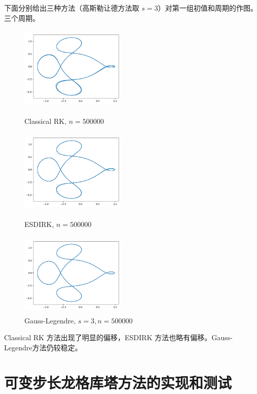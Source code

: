 \documentclass{ctexart}
\begin{document}
下面分别给出三种方法（高斯勒让德方法取 $s=3$）对第一组初值和周期的作图。三个周期。

\begin{figure}[htbp]
	\begin{minipage}{5cm}
		\centering
		\includegraphics[width = 5cm, height = 4cm]{21.png}
		\caption{Classical RK, $n=500000$}
		\label{21}
	\end{minipage}
	\begin{minipage}{5cm}
		\centering
		\includegraphics[width = 5cm, height = 4cm]{22.png}
		\caption{ESDIRK, $n=500000$}
		\label{22}
	\end{minipage}
	\begin{minipage}{5cm}
		\centering
		\includegraphics[width = 5cm, height = 4cm]{23.png}
		\caption{Gauss-Legendre, $s=3,n=500000$}
		\label{23}
	\end{minipage}
\end{figure}

Classical RK 方法出现了明显的偏移，ESDIRK 方法也略有偏移。Gauss-Legendre方法仍较稳定。

\section{可变步长龙格库塔方法的实现和测试}
\end{document}
